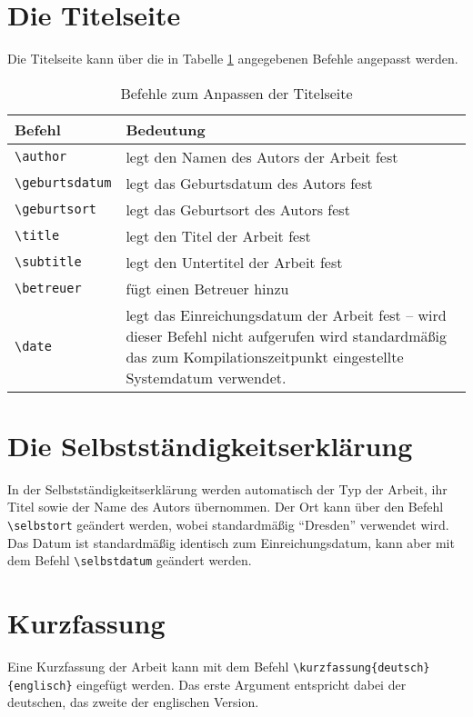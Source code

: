 \section{Die Titelseite}
Die Titelseite kann über die in Tabelle \ref{tab:titel} angegebenen Befehle angepasst werden.
\begin{table}[htbp]
\caption{Befehle zum Anpassen der Titelseite}
\label{tab:titel}
\begin{tabular}{lp{12cm}}
Befehl & Bedeutung\\
\toprule
\verb|\author| & legt den Namen des Autors der Arbeit fest\\
\verb|\geburtsdatum| & legt das Geburtsdatum des Autors fest\\
\verb|\geburtsort| & legt das Geburtsort des Autors fest\\
\verb|\title| & legt den Titel der Arbeit fest\\
\verb|\subtitle| & legt den Untertitel der Arbeit fest\\
\verb|\betreuer| & fügt einen Betreuer hinzu\\
\verb|\date| & legt das Einreichungsdatum der Arbeit fest -- \newline wird dieser Befehl nicht aufgerufen wird standardmäßig das zum Kompilationszeitpunkt eingestellte Systemdatum verwendet.\\
\bottomrule
\end{tabular}
\end{table}



\section{Die Selbstständigkeitserklärung}
In der Selbstständigkeitserklärung werden automatisch der Typ der Arbeit, ihr Titel sowie der Name des Autors übernommen. Der Ort kann über den Befehl \verb|\selbstort| geändert werden, wobei standardmäßig "`Dresden"' verwendet wird. Das Datum ist standardmäßig identisch zum Einreichungsdatum, kann aber mit dem Befehl \verb|\selbstdatum| geändert werden.



\section{Kurzfassung}
Eine Kurzfassung der Arbeit kann mit dem Befehl \verb|\kurzfassung{deutsch}{englisch}| eingefügt werden. Das erste Argument entspricht dabei der deutschen, das zweite der englischen Version.




